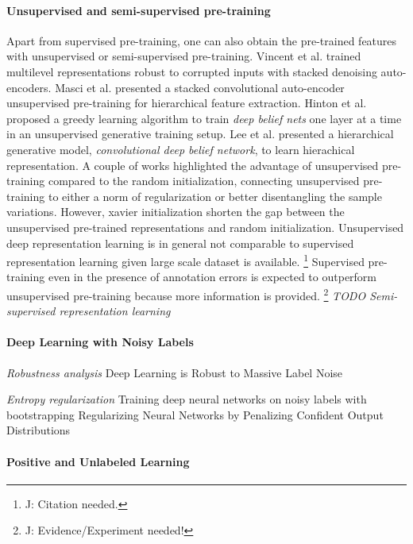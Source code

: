 \paragraph{Unsupervised and semi-supervised pre-training}
Apart from supervised pre-training, one can also obtain the pre-trained features with unsupervised or semi-supervised pre-training.
Vincent et al.\cite{vincent2010stacked} trained multilevel representations robust to corrupted inputs with stacked denoising auto-encoders.
Masci et al.\cite{masci2011stacked} presented a stacked convolutional auto-encoder unsupervised pre-training for hierarchical feature extraction.
Hinton et al.\cite{hinton2006fast} proposed a greedy learning algorithm to train \textit{deep belief nets} one layer at a time in an unsupervised generative training setup.
Lee et al.\cite{lee2009convolutional} presented a hierarchical generative model, \textit{convolutional deep belief network}, to learn hierachical representation.
A couple of works\cite{erhan2009difficulty,erhan2010does,bengio2012deep} highlighted the advantage of unsupervised pre-training compared to the random initialization, connecting unsupervised pre-training to either a norm of regularization or better disentangling the sample variations.
However, xavier initialization\cite{glorot2010understanding} shorten the gap between the unsupervised pre-trained representations and random initialization.
Unsupervised deep representation learning is in general not comparable to supervised representation learning given large scale dataset is available.
\footnote{J: Citation needed.}
Supervised pre-training even in the presence of annotation errors is expected to outperform unsupervised pre-training because more information is provided.
\footnote{J: Evidence/Experiment needed!}
\textit{TODO Semi-supervised representation learning}

\paragraph{{Deep Learning with Noisy Labels}}

\textit{Robustness analysis}
Deep Learning is Robust to Massive Label Noise \cite{rolnick2017deep}

\textit{Entropy regularization}
Training deep neural networks on noisy labels with bootstrapping \cite{reed2014training}
Regularizing Neural Networks by Penalizing Confident Output Distributions \cite{pereyra2017regularizing}


\paragraph{Positive and Unlabeled Learning}

